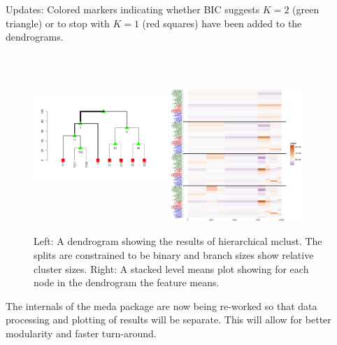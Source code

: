 \documentclass[simplex.tex]{subfiles}
\begin{document}

Updates:  Colored markers indicating whether BIC suggests $K = 2$ (green
triangle)  or to stop with $K = 1$ (red squares) have been added to the
dendrograms. 

\begin{figure}[!h]
\begin{cframed}
\centering
\includegraphics[width=0.45\textwidth, height = 2.5in, clip = true, trim = 0 -4cm 0 0]{../../figs/meda_dend_201703.png}
\includegraphics[width=0.45\textwidth, clip = true, trim = 1cm 0 5mm 1mm]{../../figs/meda_stacked_201703.png}
\caption{Left:  A dendrogram showing the results of hierarchical mclust.
The splits are constrained to be binary and branch sizes show relative
cluster sizes.  Right: A stacked level means plot showing for each node
in the dendrogram the feature means.}
\label{fig:meda}
\end{cframed}
\end{figure}

The internals of the meda package are now being re-worked so that data
processing and plotting of results will be separate. This will allow for
better modularity and faster turn-around. 

\clearpage
\end{document}
